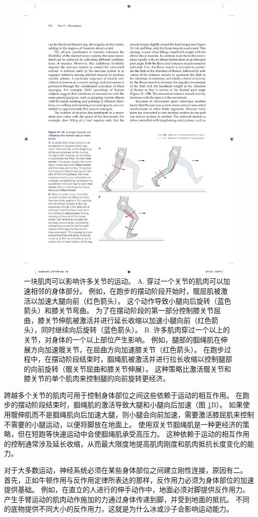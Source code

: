\begin{figure}[htbp]
	\centering
	\includegraphics[width=0.7\linewidth]{chap31/fig_31_16}
	\caption{一块肌肉可以影响许多关节的运动。 A. 穿过一个关节的肌肉可以加速相邻的身体部分。 例如，在跑步的摆动阶段开始时，髋屈肌被激活以加速大腿向前（红色箭头）。 这个动作导致小腿向后旋转（蓝色箭头）和膝关节弯曲。 为了在摆动阶段的第一部分控制膝关节屈曲，膝关节伸肌被激活并进行延长收缩以加速小腿向前（红色箭头），同时继续向后旋转（蓝色箭头）。 B. 许多肌肉穿过一个以上的关节，对身体的一个以上部位产生影响。 例如，腿部的腘绳肌在伸展方向加速髋关节，在屈曲方向加速膝关节（红色箭头）。 在跑步过程中，在摆动阶段结束时，腘绳肌被激活并进行拉长收缩以控制腿部的向前旋转（髋关节屈曲和膝关节伸展）。 这种策略比激活髋关节和膝关节的单个肌肉来控制腿的向前旋转更经济。}
	\label{fig:31_16}
\end{figure}

跨越多个关节的肌肉可用于控制身体部位之间这些依赖于运动的相互作用。
在跑步的摆动阶段结束时，腘绳肌的激活导致大腿和小腿向后加速（图 \ref{fig:31_16}B）。
如果使用髋伸肌而不是腘绳肌向后加速大腿，则小腿会向前加速，需要激活膝屈肌来控制不需要的小腿运动，以便将脚放在地面上。
使用双关节腘绳肌是一种更经济的策略，但在短跑等快速运动中会使腘绳肌承受高压力。
这种依赖于运动的相互作用的控制通常涉及延长收缩，从而最大限度地提高肌肉刚度和肌肉抵抗长度变化的能力。


对于大多数运动，神经系统必须在某些身体部位之间建立刚性连接，原因有二。
首先，正如牛顿作用与反作用定律所表达的那样，反作用力必须为身体部位的加速提供基础。
例如，在直立的人进行的伸手动作中，地面必须对脚提供反作用力。
产生手臂运动的肌肉动作施加的力通过身体传递到脚，并受到地面的抵抗。
不同的底物提供不同大小的反作用力，这就是为什么冰或沙子会影响运动能力。


